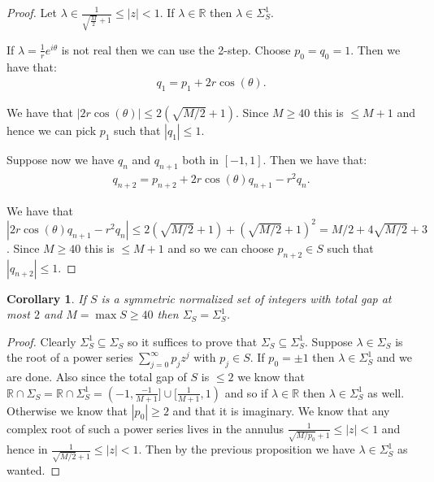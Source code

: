 \documentclass[11pt]{amsart}
\newtheorem{corollary}[theorem]{Corollary}
\numberwithin{theorem}{section} %
\numberwithin{corollary}{section}
\numberwithin{lemma}{section}
\numberwithin{proposition}{section}
\numberwithin{definition}{section}
\begin{document}
\begin{proof}
Let $\lambda \in \frac{1}{\sqrt{\frac{M}{2}} + 1} \leqslant |z| < 1$. If $\lambda \in \mathbb{R}$ then $\lambda \in \Sigma_S^1$.

If $\lambda = \frac{1}{r}e^{i\theta}$ is not real then we can use the 2-step. Choose $p_0 = q_0 = 1$. Then we have that:
\begin{align*}
q_1 = p_1 + 2r\cos(\theta).
\end{align*}

We have that $|2r\cos(\theta)| \leqslant 2(\sqrt{M/2} + 1)$. Since $M \geqslant 40$ this is $\leqslant M + 1$ and hence we can pick $p_1$ such that $|q_1| \leqslant 1$.

Suppose now we have $q_n$ and $q_{n+1}$ both in $[-1, 1]$. Then we have that:
\begin{align*}
q_{n+2} = p_{n+2} + 2r\cos(\theta)q_{n+1} - r^2q_n.
\end{align*}

We have that $|2r\cos(\theta)q_{n+1} - r^2q_n| \leqslant 2(\sqrt{M/2} + 1) + (\sqrt{M/2} + 1)^2 = M/2 + 4\sqrt{M/2} + 3$. Since $M \geqslant 40$ this is $\leqslant M+1$ and so we can choose $p_{n+2} \in S$ such that $|q_{n+2}| \leqslant 1$.

\end{proof}



\begin{corollary}
If $S$ is a symmetric normalized set of integers with total gap at most $2$ and $M = \max{S} \geqslant 40$ then $\Sigma_S = \Sigma_S^1$.
\end{corollary}

\begin{proof}
Clearly $\Sigma_S^1 \subseteq \Sigma_S$ so it suffices to prove that $\Sigma_S \subseteq \Sigma_S^1$. Suppose $\lambda \in \Sigma_S$ is the root of a power series $\sum_{j=0}^\infty p_jz^j$ with $p_j \in S$. If $p_0 = \pm 1$ then $\lambda \in \Sigma_S^1$ and we are done. Also since the total gap of $S$ is $\leqslant 2$ we know that $\mathbb{R} \cap \Sigma_S = \mathbb{R} \cap \Sigma_S^1 = (-1, \frac{-1}{M+1}] \cup [\frac{1}{M+1}, 1)$ and so if $\lambda \in \mathbb{R}$ then $\lambda \in \Sigma_S^1$ as well. Otherwise we know that $|p_0| \geqslant 2$ and that it is imaginary. We know that any complex root of such a power series lives in the annulus $\frac{1}{\sqrt{M/p_0} + 1} \leqslant |z| < 1$ and hence in $\frac{1}{\sqrt{M/2} + 1} \leqslant |z| < 1$. Then by the previous proposition we have $\lambda \in \Sigma_S^1$ as wanted.
\end{proof}
\end{document}
